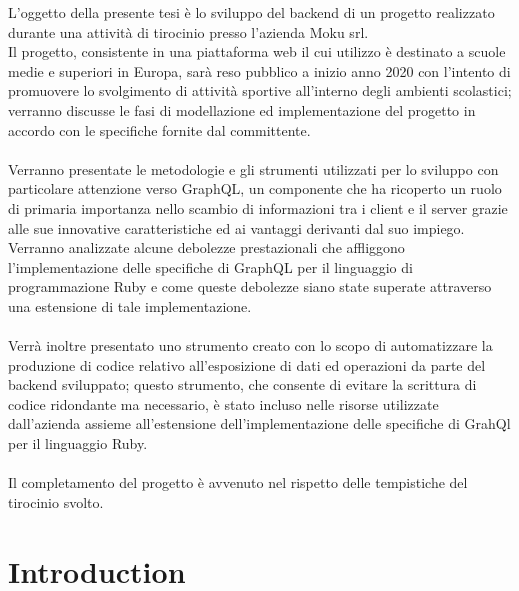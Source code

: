 \documentclass[a4paper]{article} %
\begin{document}
	L'oggetto della presente tesi è lo sviluppo del backend di un progetto realizzato durante una attività di tirocinio presso l'azienda Moku srl.\\
	Il progetto, consistente in una piattaforma web il cui utilizzo è destinato a scuole medie e superiori in Europa, sarà reso pubblico a inizio anno 2020 con l'intento di promuovere lo svolgimento di attività sportive all'interno degli ambienti scolastici; verranno discusse le fasi di modellazione ed implementazione del progetto in accordo con le specifiche fornite dal committente.\\\\
	Verranno presentate le metodologie e gli strumenti utilizzati per lo sviluppo con particolare attenzione verso GraphQL, un componente che ha ricoperto un ruolo di primaria importanza nello scambio di informazioni tra i client e il server grazie alle sue innovative caratteristiche ed ai vantaggi derivanti dal suo impiego. Verranno analizzate alcune debolezze prestazionali che affliggono l'implementazione delle specifiche di GraphQL per il linguaggio di programmazione Ruby e come queste debolezze siano state superate attraverso una estensione di tale implementazione.\\\\ 
	Verrà inoltre presentato uno strumento creato con lo scopo di automatizzare la produzione di codice relativo all'esposizione di dati ed operazioni da parte del backend sviluppato; questo strumento, che consente di evitare la scrittura di codice ridondante ma necessario, è stato incluso nelle risorse utilizzate dall'azienda assieme all'estensione dell'implementazione delle specifiche di GrahQl per il linguaggio Ruby.\\\\
	Il completamento del progetto è avvenuto nel rispetto delle tempistiche del tirocinio svolto.
	
	
	\clearpage%
	\thispagestyle{empty}%
	\addtocounter{page}{-1}%
	\null%
	\clearpage
	
	\renewcommand{\contentsname}{Indice}
	\newpage
	\thispagestyle{plain}
	\tableofcontents

	\clearpage%
	\thispagestyle{empty}%
	\addtocounter{page}{-1}%
	\null%
	\clearpage
	
	
	
	\newpage
	
	\section{ Introduction }
\end{document}
